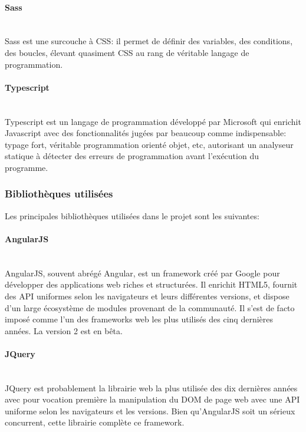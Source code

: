 \documentclass[a4paper,french,12pt]{article}
\begin{document}
			\paragraph{Sass}~\\	
			Sass est une surcouche à CSS: il permet de définir des variables, des conditions, des boucles, élevant quasiment CSS au rang de véritable langage de programmation.
			
			\paragraph{Typescript} ~\\	
			Typescript est un langage de programmation développé par Microsoft qui enrichit Javascript avec des fonctionnalités jugées par beaucoup comme indispensable: typage fort, véritable programmation orienté objet, etc, autorisant un analyseur statique à détecter des erreurs de programmation avant l'exécution du programme.

		\subsubsection{Bibliothèques utilisées}
		Les principales bibliothèques utilisées dans le projet sont les suivantes:

		  \paragraph{AngularJS}~\\	
		  	AngularJS, souvent abrégé Angular, est un framework créé par Google pour développer des applications web riches et structurées.
		  	Il enrichit HTML5, fournit des API uniformes selon les navigateurs et leurs différentes versions, et dispose d'un large écosystème de modules provenant de la communauté.
		  	Il s'est de facto imposé comme l'un des frameworks web les plus utilisés des cinq dernières années. La version 2 est en bêta.

		\paragraph{JQuery}~\\	
		JQuery est probablement la librairie web la plus utilisée des dix dernières années avec pour vocation première la manipulation du DOM de page web avec une API uniforme selon les navigateurs et les versions. Bien qu'AngularJS soit un sérieux concurrent, cette librairie complète ce framework.
		  	
\end{document}
